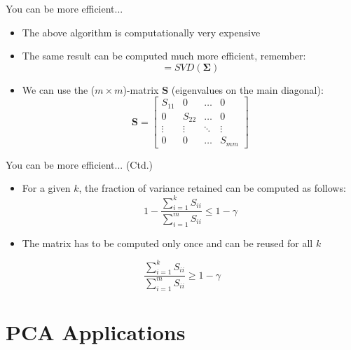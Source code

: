 \begin{frame}{You can be more efficient...}{}
	\begin{itemize}
		\item The above algorithm is computationally very expensive
		\item The same result can be computed much more efficient, remember:
		\begin{equation}
			[\bm{U}, \bm{S}, \bm{V}] = SVD(\bm{\Sigma})
		\end{equation}
		\item We can use the ($m \times m$)-matrix $\bm{S}$ (eigenvalues on the main diagonal):
		\footnotesize
		\begin{equation}
			\bm{S} =
			\begin{bmatrix}
				S_{11} 	& 0 		& \hdots 	& 0 			\\
				0 		& S_{22} 	& \hdots 	& 0 			\\
				\vdots 	& \vdots 	& \ddots 	& \vdots 		\\
				0 		& 0 		& \hdots 	& S_{mm}
			\end{bmatrix}
		\end{equation}
	\end{itemize}
\end{frame}


\begin{frame}{You can be more efficient... (Ctd.)}{}
	\begin{itemize}
		\item For a given $k$, the fraction of variance retained can be computed as follows:
		\begin{equation}
			1 - \frac{\sum_{i=1}^k S_{ii}}{\sum_{i=1}^m S_{ii}} \le 1 - \gamma
		\end{equation}
		\item The matrix has to be computed only once and can be reused for all $k$
	\end{itemize}
	\begin{boxBlueNoFrame}
		\begin{equation*}
			\frac{\sum_{i=1}^k S_{ii}}{\sum_{i=1}^m S_{ii}} \ge 1 - \gamma
		\end{equation*}
	\end{boxBlueNoFrame}
\end{frame}


\section{PCA Applications}

